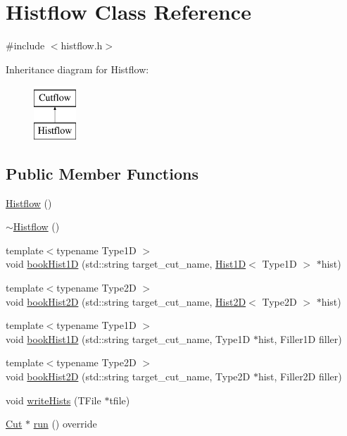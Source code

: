 \hypertarget{classHistflow}{}\section{Histflow Class Reference}
\label{classHistflow}


{\ttfamily \#include $<$histflow.\+h$>$}

Inheritance diagram for Histflow\+:\begin{figure}[H]
\begin{center}
\leavevmode
\includegraphics[height=2.000000cm]{classHistflow}
\end{center}
\end{figure}
\subsection*{Public Member Functions}
\begin{DoxyCompactItemize}
\item 
\hyperlink{classHistflow_ae4c76353f6d545eca787fc0abf1a433e}{Histflow} ()
\item 
\hyperlink{classHistflow_aa1adf4cd5e253c51f4e9febf97e11da1}{$\sim$\+Histflow} ()
\item 
{\footnotesize template$<$typename Type1D $>$ }\\void \hyperlink{classHistflow_a0fc41c86984acdd1b2a271be83ecf69d}{book\+Hist1D} (std\+::string target\+\_\+cut\+\_\+name, \hyperlink{classHist1D}{Hist1D}$<$ Type1D $>$ $\ast$hist)
\item 
{\footnotesize template$<$typename Type2D $>$ }\\void \hyperlink{classHistflow_a16858deb3566f6b64c4ac21c309d0a2c}{book\+Hist2D} (std\+::string target\+\_\+cut\+\_\+name, \hyperlink{classHist2D}{Hist2D}$<$ Type2D $>$ $\ast$hist)
\item 
{\footnotesize template$<$typename Type1D $>$ }\\void \hyperlink{classHistflow_a07a698624a6376ebdcef8ef9b025ef33}{book\+Hist1D} (std\+::string target\+\_\+cut\+\_\+name, Type1D $\ast$hist, Filler1D filler)
\item 
{\footnotesize template$<$typename Type2D $>$ }\\void \hyperlink{classHistflow_a425698092efa7ec2389b9fb83d26dc84}{book\+Hist2D} (std\+::string target\+\_\+cut\+\_\+name, Type2D $\ast$hist, Filler2D filler)
\item 
void \hyperlink{classHistflow_a06a2e1683cdc7ac2731b4608abe15eb7}{write\+Hists} (T\+File $\ast$tfile)
\item 
\hyperlink{classCut}{Cut} $\ast$ \hyperlink{classHistflow_aeb075eb05c888a31fc059a97aab22acd}{run} () override
\end{DoxyCompactItemize}

